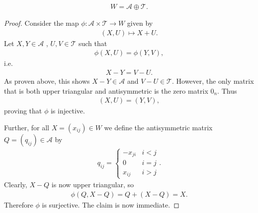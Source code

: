 \documentclass{article}
\begin{document}
\begin{claim*}[1a]
	\begin{align*}
		W=\mathcal{A}\oplus\mathcal{T}.
	\end{align*}
	\begin{proof}
		Consider the map $\phi:\mathcal{A}\times\mathcal{T}\to W$ given by
		\begin{align*}
			(X,U)\mapsto X+U.
		\end{align*}
		Let $X,Y\in\mathcal{A}$ , $U,V\in\mathcal{T}$ such that
		\begin{align*}
			\phi(X,U)=\phi(Y,V),
		\end{align*}
		i.e.
		\begin{align*}
			X-Y=V-U.
		\end{align*}
		As proven above, this shows $X-Y\in\mathcal{A}$ and $V-U\in\mathcal{T}$. However, the only matrix
		that is both upper triangular and antisymmetric is the zero matrix $0_n$.
		Thus
		\begin{align*}
			(X,U)=(Y,V),
		\end{align*}
		proving that $\phi$ is injective.

		Further, for all $X=(x_{ij})\in W$ we define the antisymmetric matrix $Q=(q_{ij})\in\mathcal{A}$
		by
		\begin{align*}
			q_{ij}=\begin{cases}
				       -x_{ji} & i<j \\
				       0       & i=j \\
				       x_{ij}  & i>j
			       \end{cases}.
		\end{align*}
		Clearly, $X-Q$ is now upper triangular, so
		\begin{align*}
			\phi(Q,X-Q)=Q+(X-Q)=X.
		\end{align*}
		Therefore $\phi$ is surjective. The claim is now immediate.
	\end{proof}
\end{claim*}
\end{document}
